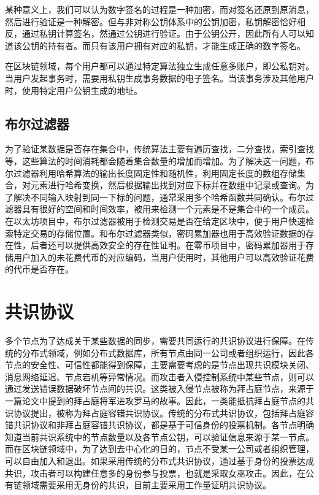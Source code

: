 某种意义上，我们可以认为数字签名的过程是一种加密，而对签名还原到原消息，然后进行验证是一种解密。但与非对称公钥体系中的公钥加密，私钥解密恰好相反，通过私钥计算签名，然通过公钥进行验证。由于公钥公开，因此所有人可以知道该公钥的持有者。而只有该用户拥有对应的私钥，才能生成正确的数字签名。

在区块链领域，每个用户都可以通过特定算法独立生成任意多账户，即公私钥对。当用户发起事务时，需要用私钥生成事务数据的电子签名。当该事务涉及其他用户时，使用特定用户公钥生成的地址。

\subsection{布尔过滤器}

为了验证某数据是否存在集合中，传统算法主要有遍历查找，二分查找，索引查找等，这些算法的时间消耗都会随着集合数量的增加而增加。为了解决这一问题，布尔过滤器利用哈希算法的输出长度固定性和随机性，利用固定长度的数组存储集合，对元素进行哈希变换，然后根据输出找到对应下标并在数组中记录或查询。为了解决不同输入映射到同一下标的问题，通常采用多个哈希函数共同确认。布尔过滤器具有很好的空间和时间效率，被用来检测一个元素是不是集合中的一个成员。在以太坊项目中，布尔过滤器被用于检测交易是否在给定区块中，便于用户快速检索特定交易的存储位置。和布尔过滤器类似，密码累加器也用于高效验证数据的存在性，后者还可以提供高效安全的存在性证明。在零币项目中，密码累加器用于存储用户加入的未花费代币的对应编码，当用户使用时，其他用户可以高效验证花费的代币是否存在。

\section{共识协议}

多个节点为了达成关于某些数据的同步，需要共同运行的共识协议进行保障。在传统的分布式领域，例如分布式数据库，所有节点由同一公司或者组织运行，因此各节点的安全性、可信性都能得到保障，主要需要考虑的是节点出现共识模块关闭、消息网络延迟、节点宕机等异常情况。而攻击者入侵控制系统中某些节点，则可以通过发送错误数据破坏节点间的共识。这类被入侵节点被称为拜占庭节点，来源于一篇论文中提到的拜占庭将军进攻罗马的故事。因此，一类能抵抗拜占庭节点的共识协议提出，被称为拜占庭容错共识协议。传统的分布式共识协议，包括拜占庭容错共识协议和非拜占庭容错共识协议，都是基于可信身份的投票机制。各节点明确知道当前共识系统中的节点数量以及各节点公钥，可以验证信息来源于某一节点。而在区块链领域中，为了达到去中心化的目的，节点不受某一公司或者组织管理，可以自由加入和退出。如果采用传统的分布式共识协议，通过基于身份的投票达成共识，攻击者可以构建任意多的身份参与投票，也就是采取女巫攻击。因此，在公有链领域需要采用无身份的共识，目前主要采用工作量证明共识协议。

